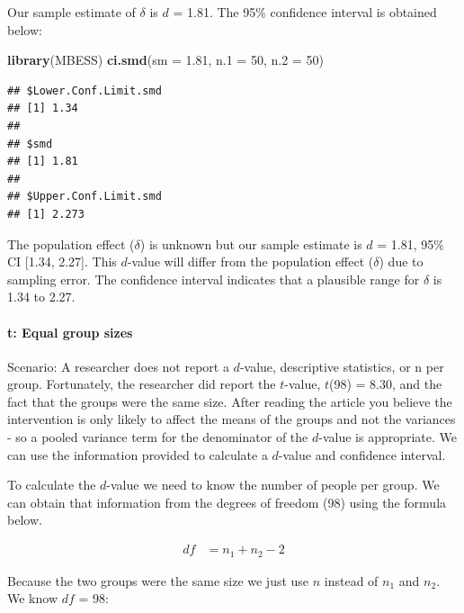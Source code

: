 \documentclass[
]{krantz}
\makeatletter
\newenvironment{Shaded}{\begin{snugshade}}{\end{snugshade}}
\newcommand{\DataTypeTok}[1]{\textcolor[rgb]{0.27,0.27,0.27}{#1}}
\newcommand{\DecValTok}[1]{\textcolor[rgb]{0.06,0.06,0.06}{#1}}
\newcommand{\FloatTok}[1]{\textcolor[rgb]{0.06,0.06,0.06}{#1}}
\newcommand{\KeywordTok}[1]{\textcolor[rgb]{0.27,0.27,0.27}{\textbf{#1}}}
\newcommand{\NormalTok}[1]{#1}
\newenvironment{kframe}{%
\medskip{}
\setlength{\fboxsep}{.8em}
 \def\at@end@of@kframe{}%
 \ifinner\ifhmode%
  \def\at@end@of@kframe{\end{minipage}}%
  \begin{minipage}{\columnwidth}%
 \fi\fi%
 \def\FrameCommand##1{\hskip\@totalleftmargin \hskip-\fboxsep
 \colorbox{shadecolor}{##1}\hskip-\fboxsep
     \hskip-\linewidth \hskip-\@totalleftmargin \hskip\columnwidth}%
 \MakeFramed {\advance\hsize-\width
   \@totalleftmargin\z@ \linewidth\hsize
   \@setminipage}}%
 {\par\unskip\endMakeFramed%
 \at@end@of@kframe}
\renewenvironment{Shaded}{\begin{kframe}}{\end{kframe}}
\makeatother
\begin{document}
Our sample estimate of \(\delta\) is \(d\) = 1.81. The 95\% confidence interval is obtained below:

\begin{Shaded}
\begin{Highlighting}[]
\KeywordTok{library}\NormalTok{(MBESS)}
\KeywordTok{ci.smd}\NormalTok{(}\DataTypeTok{sm =} \FloatTok{1.81}\NormalTok{, }\DataTypeTok{n.1 =} \DecValTok{50}\NormalTok{, }\DataTypeTok{n.2 =} \DecValTok{50}\NormalTok{) }
\end{Highlighting}
\end{Shaded}

\begin{verbatim}
## $Lower.Conf.Limit.smd
## [1] 1.34
## 
## $smd
## [1] 1.81
## 
## $Upper.Conf.Limit.smd
## [1] 2.273
\end{verbatim}

The population effect (\(\delta\)) is unknown but our sample estimate is \(d\) = 1.81, 95\% CI {[}1.34, 2.27{]}. This \(d\)-value will differ from the population effect (\(\delta\)) due to sampling error. The confidence interval indicates that a plausible range for \(\delta\) is 1.34 to 2.27.

\hypertarget{t-equal-group-sizes}{%
\paragraph{t: Equal group sizes}\label{t-equal-group-sizes}}

Scenario: A researcher does not report a \(d\)-value, descriptive statistics, or n per group. Fortunately, the researcher did report the \(t\)-value, \(t\)(98) = 8.30, and the fact that the groups were the same size. After reading the article you believe the intervention is only likely to affect the means of the groups and not the variances - so a pooled variance term for the denominator of the \(d\)-value is appropriate. We can use the information provided to calculate a \(d\)-value and confidence interval.

To calculate the \(d\)-value we need to know the number of people per group. We can obtain that information from the degrees of freedom (98) using the formula below.

\[
\begin{aligned}
df &= n_1 + n_2 - 2
\end{aligned}
\]

Because the two groups were the same size we just use \(n\) instead of \(n_1\) and \(n_2\). We know \(df\) = 98:
\end{document}
